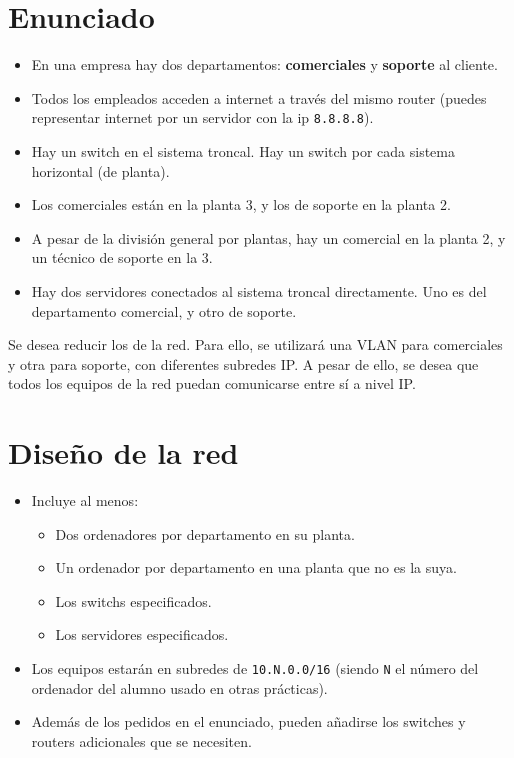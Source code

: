 \section{Enunciado}
\begin{itemize}
\item En una empresa hay dos departamentos: \textbf{comerciales} y \textbf{soporte} al cliente.
\item Todos los empleados acceden a internet a través del mismo router (puedes representar internet por un servidor con la ip \texttt{8.8.8.8}).
\item Hay un switch en el sistema troncal. Hay un switch por cada sistema horizontal (de planta).  
\item Los comerciales están en la planta 3, y los de soporte en la planta 2.
\item A pesar de la división general por plantas, hay un comercial en la planta 2, y un técnico de soporte en la 3.
\item Hay dos servidores conectados al sistema troncal directamente. Uno es del departamento comercial, y otro de soporte.
\end{itemize}
Se desea reducir los  de la red. Para ello, se utilizará una VLAN para comerciales y otra para soporte, con diferentes subredes IP.
A pesar de ello, se desea que todos los equipos de la red puedan comunicarse entre sí a nivel IP.

\section{Diseño de la red}
\begin{itemize}
\item Incluye al menos:
  \begin{itemize}
  \item Dos ordenadores por departamento en su planta.
  \item Un ordenador por departamento en una planta que no es la suya.
  \item Los switchs especificados.
  \item Los servidores especificados.
  \end{itemize}
\item Los equipos estarán en subredes de \texttt{10.N.0.0/16} (siendo \texttt{N} el número del ordenador del alumno usado en otras prácticas).
\item Además de los pedidos en el enunciado, pueden añadirse los switches y routers adicionales que se necesiten.  
\end{itemize}

